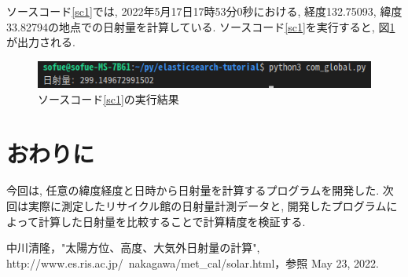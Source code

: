 \documentclass[a4j,12pt,]{jarticle}
\begin{document}
ソースコード\ref{sc1}では, 2022年5月17日17時53分0秒における, 経度132.75093, 緯度33.82794の地点での日射量を計算している.
ソースコード\ref{sc1}を実行すると, 図\ref{p1}が出力される.

\begin{figure}[H]
  \begin{center}
    \includegraphics[width=160mm]{output.png}
    \caption{ソースコード\ref{sc1}の実行結果}
    \label{p1}
  \end{center}
\end{figure}

\section{おわりに}
今回は, 任意の緯度経度と日時から日射量を計算するプログラムを開発した.
次回は実際に測定したリサイクル館の日射量計測データと, 開発したプログラムによって計算した日射量を比較することで計算精度を検証する.

\begin{thebibliography}{5}
  中川清隆，"太陽方位、高度、大気外日射量の計算", http://www.es.ris.ac.jp/~nakagawa/met\_cal/solar.html，参照 May 23, 2022.
\end{thebibliography}
\end{document}
